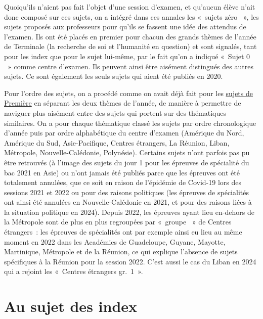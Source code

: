 Quoiqu'ils n'aient pas fait l'objet d'une session d'examen, et qu'aucun élève n'ait donc composé sur ces sujets, on a intégré dans ces annales les «~sujets zéro ~», \cad{} les sujets proposés aux professeurs pour qu'ils se fassent une idée des attendus de l'examen. Ils ont été placés en premier pour chacun des grands thèmes de l'année de Terminale (la recherche de soi et l'humanité en question) et sont signalés, tant pour les index que pour le sujet lui-même, par le fait qu'on a indiqué «~Sujet 0 ~» comme centre d'examen. Ils peuvent ainsi être aisément distingués des autres sujets. Ce sont également les seuls sujets qui aient été publiés en 2020.

Pour l'ordre des sujets, on a procédé comme on avait déjà fait pour les \href{https://drive.google.com/file/d/1KN7gwAOkmIXFNAGYKYemD3y7Q0n68Phn/view?usp=sharing}{sujets de Première} en séparant les deux thèmes de l'année, de manière à permettre de naviguer plus aisément entre des sujets qui portent sur des thématiques similaires. On a pour chaque thématique classé les sujets par ordre chronologique d'année puis par ordre alphabétique du centre d'examen (Amérique du Nord, Amérique du Sud, Asie-Pacifique, Centres étrangers, La Réunion, Liban, Métropole, Nouvelle-Calédonie, Polynésie). Certains sujets n'ont parfois pas pu être retrouvés (à l'image des sujets du jour 1 pour les épreuves de spécialité du bac 2021 en Asie) ou n'ont jamais été publiés parce que les épreuves ont été totalement annulées, que ce soit en raison de l'épidémie de Covid-19 lors des sessions 2021 et 2022 ou pour des raisons politiques (les épreuves de spécialités ont ainsi été annulées en Nouvelle-Calédonie en 2021, et pour des raisons liées à la situation politique en 2024). Depuis 2022, les épreuves ayant lieu en-dehors de la Métropole sont de plus en plus regroupées par «~groupe ~» de Centres étrangers~: les épreuves de spécialités ont par exemple ainsi eu lieu au même moment en 2022 dans les Académies de Guadeloupe, Guyane, Mayotte, Martinique, Métropole et de la Réunion, ce qui explique l'absence de sujets spécifiques à la Réunion pour la session 2022. C'est aussi le cas du Liban en 2024 qui a rejoint les «~Centres étrangers gr.~1~».

\section*{Au sujet des index}

